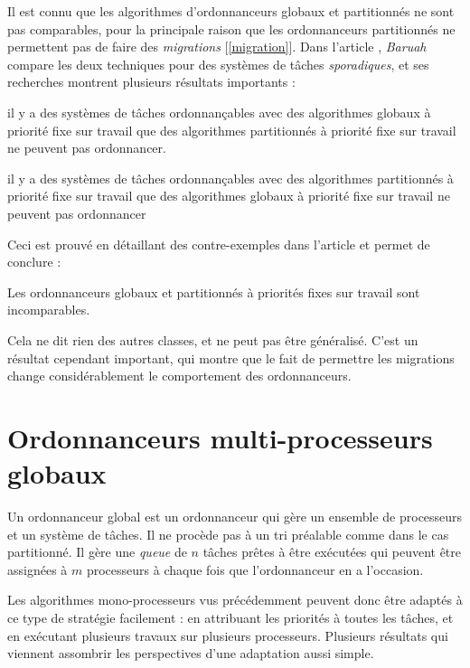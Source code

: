 	Il est connu que les algorithmes d'ordonnanceurs globaux et partitionnés ne sont pas comparables, 
	pour la principale raison que les ordonnanceurs partitionnés ne permettent pas de faire des 
	\textit{migrations} [\ref{migration}]. Dans l'article \cite{baruah_techniques_2007}, \textit{Baruah} 
	compare les deux techniques pour des systèmes de tâches \textit{sporadiques}, et 
	ses recherches montrent plusieurs résultats importants :\medskip
	\begin{mylemme}
		il y a des systèmes de tâches ordonnançables avec des algorithmes globaux à priorité fixe 
		sur travail que des algorithmes partitionnés à priorité fixe sur travail ne peuvent pas ordonnancer.
	\end{mylemme}
	
	\begin{mylemme}
		il y a des systèmes de tâches ordonnançables avec des algorithmes partitionnés à priorité fixe 
		sur travail que des algorithmes globaux à priorité fixe sur travail ne peuvent pas ordonnancer
	\end{mylemme}
	Ceci est prouvé en détaillant des contre-exemples dans l'article et permet de conclure :\medskip
	\begin{mytheorem}
		Les ordonnanceurs globaux et partitionnés à priorités fixes sur travail sont incomparables.
	\end{mytheorem}
	Cela ne dit rien des autres classes, et ne peut pas être généralisé. C'est 
	un résultat cependant important, qui montre que le fait de permettre les migrations
	change considérablement le comportement des ordonnanceurs.
	
	\section{Ordonnanceurs multi-processeurs globaux}
	Un ordonnanceur global est un ordonnanceur qui gère un ensemble de processeurs et 
	un système de tâches. Il ne procède pas à un tri préalable comme dans le cas partitionné. 
	Il gère une \textit{queue} de $n$ tâches prêtes à être exécutées 
	qui peuvent être assignées à $m$ processeurs à chaque fois que l'ordonnanceur en a l'occasion.\medskip
	
	Les algorithmes mono-processeurs vus précédemment peuvent donc être adaptés 
	à ce type de stratégie facilement : en attribuant les priorités à toutes les tâches, et en 
	exécutant plusieurs travaux sur plusieurs processeurs. 
	Plusieurs résultats qui viennent assombrir les perspectives d'une adaptation aussi simple. \medskip
	
